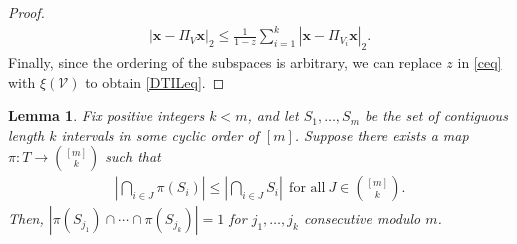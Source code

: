 \documentclass[journal, onecolumn]{IEEEtran}
\newtheorem{lemma}{Lemma}
\begin{document}
\begin{proof}
%
\begin{align}\label{ceq}
|\mathbf{x} - \Pi_V \mathbf{x}|_2 \leq \frac{1}{1 - z} \sum_{i=1}^k |\mathbf{x} - \Pi_{V_i} \mathbf{x}|_2.
\end{align}
Finally, since the ordering of the subspaces is arbitrary, we can replace $z$ in \eqref{ceq} with $\xi(\mathcal{V})$ to obtain \eqref{DTILeq}.
\end{proof}




\begin{lemma}\label{NonEmptyLemma} Fix positive integers $k < m$, and let $S_1, \ldots, S_m$ be the set of contiguous length $k$ intervals in some cyclic order of $[m]$. Suppose there exists a map $\pi: T \to {[m] \choose k}$ such that
\begin{align}\label{NonEmpty}
|\bigcap_{i \in J} \pi(S_i)| \leq |\bigcap_{i \in J} S_i | \ \ \text{for all} \ J \in {[m] \choose k}.
\end{align}
%
Then, $|\pi(S_{j_1}) \cap \cdots \cap \pi(S_{j_k})| = 1$ for $j_1,\ldots,j_k$ consecutive modulo $m$.
\end{lemma}
\end{document}
